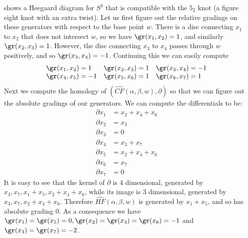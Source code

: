 \begin{example}
 shows a Heegaard diagram for $S^3$ that is compatible with the $5_2$ knot (a figure eight knot with an extra twist). Let us first figure out the relative gradings on these generators with respect to the base point $w$. There is a disc connecting $x_1$ to $x_2$ that does not intersect $w$, so we have $\gr(x_1,x_2)=1$, and similarly $\gr(x_2,x_3)=1$. However, the disc connecting $x_3$ to $x_4$ passes through $w$ positively, and so $\gr(x_3,x_4)=-1$. Continuing this we can easily compute
\[
\begin{array}{lll}
\gr(x_1,x_2) = 1 & \gr(x_2,x_3) = 1 & \gr(x_3,x_4) = -1 \\
\gr(x_4,x_5) = -1 & \gr(x_5,x_6) = 1 & \gr(x_6,x_7) = 1 
\end{array}
\]
Next we compute the homology of $(\widehat{CF}(\alpha,\beta,w),\partial)$ so that we can figure out the absolute gradings of our generators. We can compute the differentials to be:
\[
\begin{array}{rl}
	\partial x_1 &= x_2 + x_4 + x_6 \\
	\partial x_2 &= x_3 \\
	\partial x_3 &= 0 \\
	\partial x_4 &= x_3 + x_7 \\
	\partial x_5 &= x_2 + x_4 + x_6 \\
	\partial x_6 &= x_7 \\
	\partial x_7 &= 0
\end{array}
\]
It is easy to see that the kernel of $\partial$ is 4 dimensional, generated by $x_3,x_7,x_1+x_5,x_2+x_4+x_6$, while its image is 3 dimensional, generated by $x_3,x_7,x_2+x_4+x_6$. Therefore $\widehat{HF}(\alpha,\beta,w)$ is generated by $x_1+x_5$, and so has absolute grading 0. As a consequence we have $\gr(x_1)=\gr(x_5)=0, \gr(x_2)=\gr(x_4)=\gr(x_6)=-1$ and $\gr(x_3)=\gr(x_7)=-2$.


\end{example}
